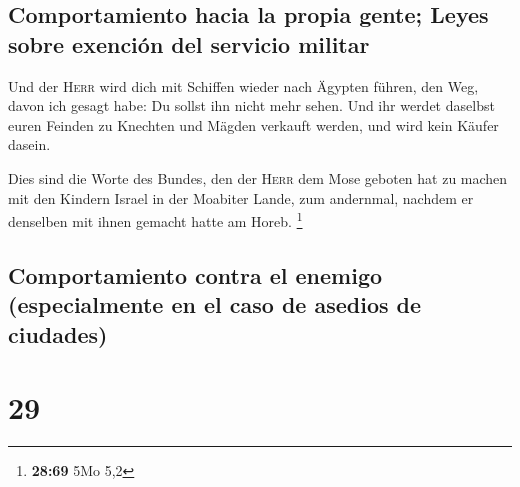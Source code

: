 \hypertarget{comportamiento-hacia-la-propia-gente-leyes-sobre-exenciuxf3n-del-servicio-militar}{%
\subsection{Comportamiento hacia la propia gente; Leyes sobre exención
del servicio
militar}\label{comportamiento-hacia-la-propia-gente-leyes-sobre-exenciuxf3n-del-servicio-militar}}

 Und der \textsc{Herr} wird dich mit Schiffen wieder nach
Ägypten führen, den Weg, davon ich gesagt habe: Du sollst ihn nicht mehr
sehen. Und ihr werdet daselbst euren Feinden zu Knechten und Mägden
verkauft werden, und wird kein Käufer dasein.

 Dies sind die Worte des Bundes, den der \textsc{Herr}
dem Mose geboten hat zu machen mit den Kindern Israel in der Moabiter
Lande, zum andernmal, nachdem er denselben mit ihnen gemacht hatte am
Horeb. \footnote{\textbf{28:69} 5Mo 5,2}

\hypertarget{comportamiento-contra-el-enemigo-especialmente-en-el-caso-de-asedios-de-ciudades}{%
\subsection{Comportamiento contra el enemigo (especialmente en el caso
de asedios de
ciudades)}\label{comportamiento-contra-el-enemigo-especialmente-en-el-caso-de-asedios-de-ciudades}}

\hypertarget{section-28}{%
\section{29}\label{section-28}}

